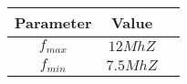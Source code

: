 

\begin{tabular}{|c|c|c|}
\hline
\textbf{Parameter}&\textbf{Value}\\
   \hline
    ${f_{max}}$  & $12 MhZ$ \\
   \hline
   $f_{min}$ & $7.5 MhZ$ \\
   \hline
\end{tabular}

